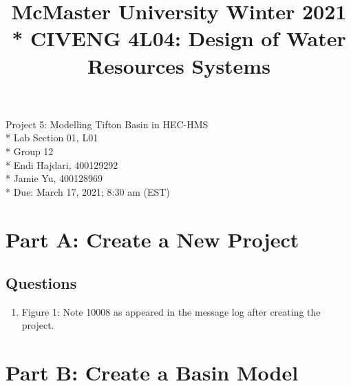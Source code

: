 \documentclass[]{article}
\title{\large{McMaster University Winter 2021} \LARGE \\* CIVENG 4L04: Design of Water Resources Systems}
\date{}
\begin{document}
	\maketitle
	\thispagestyle{empty}
	\begin{center}
		\vspace{3.6cm}
		\Huge Project 5: Modelling Tifton Basin in HEC-HMS \\* \vspace{1cm}
		\Large Lab Section 01, L01 \\* \vspace{1cm}
		\Large Group 12 \\* \vspace{0.25cm}
		\large Endi Hajdari, 400129292 \\* \vspace{0.05cm}
		Jamie Yu, 400128969 \\* \vspace{6cm}
		\large Due: March 17, 2021; 8:30 am (EST) 
	\end{center}	
	\newpage
	\doublespacing
	\tableofcontents
	\singlespacing
	\newpage 
	\section{Part A: Create a New Project}
	\subsection{Questions}
	\vspace{0.5 cm}
	\begin{enumerate}[label=\textbf{\arabic*.}] 
		\item \begin{minipage}[t]{\linewidth}
		\raggedright
		
		\medskip
		\begin{center} 
			Figure 1: Note 10008 as appeared in the message log after creating the project.
		\end{center}
	\end{minipage}
	\end{enumerate} \vspace{1cm}
\section{Part B: Create a Basin Model}
\end{document}
